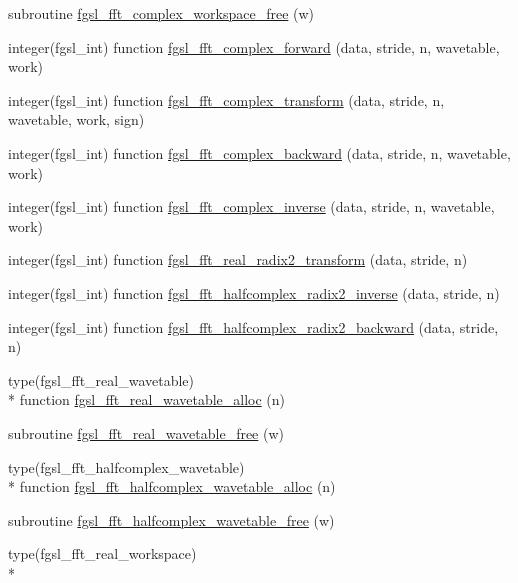 \begin{DoxyCompactItemize}
\item 
subroutine \hyperlink{fft_8finc_a349930160b7e3aa8c2d622086c18cc9f}{fgsl\-\_\-fft\-\_\-complex\-\_\-workspace\-\_\-free} (w)
\item 
integer(fgsl\-\_\-int) function \hyperlink{fft_8finc_a93cd04b58e8404ebe91398ddf33ac2ee}{fgsl\-\_\-fft\-\_\-complex\-\_\-forward} (data, stride, n, wavetable, work)
\item 
integer(fgsl\-\_\-int) function \hyperlink{fft_8finc_a376d447a1955ebc92b2e87a5712185b1}{fgsl\-\_\-fft\-\_\-complex\-\_\-transform} (data, stride, n, wavetable, work, sign)
\item 
integer(fgsl\-\_\-int) function \hyperlink{fft_8finc_a5d26359427318351552aa35ba54fe56a}{fgsl\-\_\-fft\-\_\-complex\-\_\-backward} (data, stride, n, wavetable, work)
\item 
integer(fgsl\-\_\-int) function \hyperlink{fft_8finc_ad553e482847f3d81c3f4bb7f43e68053}{fgsl\-\_\-fft\-\_\-complex\-\_\-inverse} (data, stride, n, wavetable, work)
\item 
integer(fgsl\-\_\-int) function \hyperlink{fft_8finc_a83d3ca22179c1492451233146284096e}{fgsl\-\_\-fft\-\_\-real\-\_\-radix2\-\_\-transform} (data, stride, n)
\item 
integer(fgsl\-\_\-int) function \hyperlink{fft_8finc_a221b77aa4c793385e078efff48b05b78}{fgsl\-\_\-fft\-\_\-halfcomplex\-\_\-radix2\-\_\-inverse} (data, stride, n)
\item 
integer(fgsl\-\_\-int) function \hyperlink{fft_8finc_aa85ca51ea5f1e86190979008004c3e90}{fgsl\-\_\-fft\-\_\-halfcomplex\-\_\-radix2\-\_\-backward} (data, stride, n)
\item 
type(fgsl\-\_\-fft\-\_\-real\-\_\-wavetable) \\*
function \hyperlink{fft_8finc_a2d6bd839e5cea8c45db50f3f39250daf}{fgsl\-\_\-fft\-\_\-real\-\_\-wavetable\-\_\-alloc} (n)
\item 
subroutine \hyperlink{fft_8finc_a1a476c3a23eb0379cce21b6796c38f26}{fgsl\-\_\-fft\-\_\-real\-\_\-wavetable\-\_\-free} (w)
\item 
type(fgsl\-\_\-fft\-\_\-halfcomplex\-\_\-wavetable) \\*
function \hyperlink{fft_8finc_a8d7b46f387eaaf4045a2ae2a8e71acee}{fgsl\-\_\-fft\-\_\-halfcomplex\-\_\-wavetable\-\_\-alloc} (n)
\item 
subroutine \hyperlink{fft_8finc_aea9fde2535cade327c22905e9507060b}{fgsl\-\_\-fft\-\_\-halfcomplex\-\_\-wavetable\-\_\-free} (w)
\item 
type(fgsl\-\_\-fft\-\_\-real\-\_\-workspace) \\*

\end{DoxyCompactItemize}
